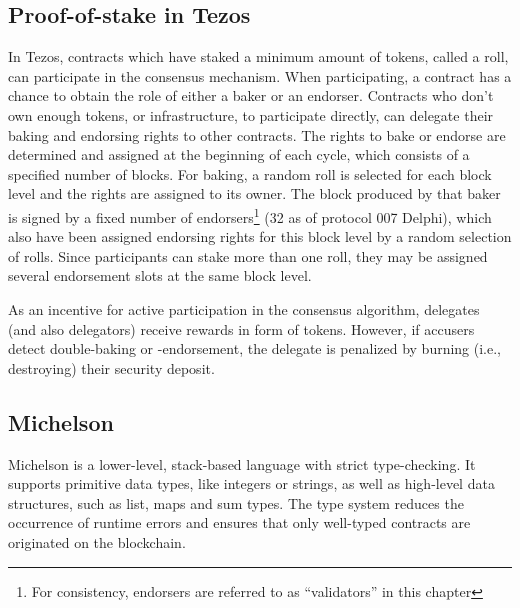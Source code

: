 \subsection{Proof-of-stake in Tezos}
In Tezos, contracts which have staked a minimum amount of tokens, called a roll, can participate in the consensus mechanism. When participating, a contract has a chance to obtain the role of either a baker or an endorser. Contracts who don't own enough tokens, or infrastructure, to participate directly, can delegate their baking and endorsing rights to other contracts. The rights to bake or endorse are determined and assigned at the beginning of each cycle, which consists of a specified number of blocks. For baking, a random roll is selected for each block level and the rights are assigned to its owner. The block produced by that baker is signed by a fixed number of endorsers\footnote{For consistency, endorsers are referred to as ``validators'' in this chapter} (32 as of protocol 007 Delphi), which also have been assigned endorsing rights for this block level by a random selection of rolls. Since participants can stake more than one roll, they may be assigned several endorsement slots at the same block level.

As an incentive for active participation in the consensus algorithm, delegates (and also delegators) receive rewards in form of tokens. However, if accusers detect double-baking or -endorsement, the delegate is penalized by burning (i.e., destroying) their security deposit.

\subsection{Michelson}
Michelson is a lower-level, stack-based language with strict type-checking. It supports primitive data types, like integers or strings, as well as high-level data structures, such as list, maps and sum types. The type system reduces the occurrence of runtime errors and ensures that only well-typed contracts are originated on the blockchain.

